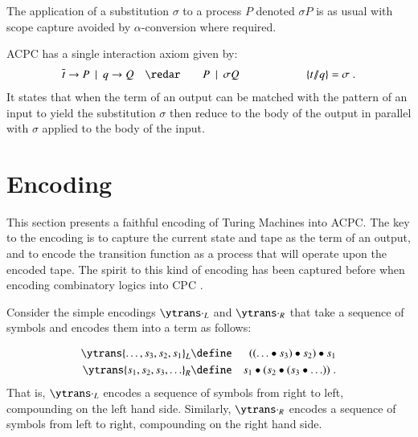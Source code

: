 \documentclass[submission,copyright,creativecommons]{eptcs}
\def\BNF{\ \  | \ \  }
\renewcommand{\iap}[1]{#1\to}
\renewcommand{\oap}[1]{\overline{#1}\to}
\begin{document}
The application of a substitution $\sigma$ to a process $P$ denoted $\sigma P$ is
as usual with scope capture avoided by $\alpha$-conversion where required.

ACPC has a single interaction axiom given by:
\begin{eqnarray*}
\oap t P \BNF \iap q Q &\quad\redar\quad& P \BNF \sigma Q\qquad\qquad\qquad \match t q = \sigma\;.
\end{eqnarray*}
It states that when the term of an output can be matched with the pattern of an input to
yield the substitution $\sigma$ then reduce to the body of the output in parallel with
$\sigma$ applied to the body of the input.



\section{Encoding}
\label{sec:enc}

\newcommand{\enclist}[2]{#2} 
This section presents a faithful encoding of Turing Machines into ACPC.
The key to the encoding is to capture the current state and tape as the term of
an output, and to encode the transition function as a process that will operate
upon the encoded tape.
The spirit to this kind of encoding has been captured before when encoding
combinatory logics into CPC \cite{GivenWilsonPhD}.

Consider the simple encodings $\ytrans \cdot _L$ and $\ytrans \cdot _R$ that take a sequence of symbols
and encodes them into a term as follows:
\enclist{
\begin{eqnarray*}
\ytrans{\ldots,s_3,s_2,s_1} _L &\define& s_1\bullet (s_2\bullet (s_3\bullet \ldots))\\
\ytrans{s_1,s_2,s_3,\ldots} _R &\define& s_1\bullet (s_2\bullet (s_3\bullet \ldots))\; .
\end{eqnarray*}
That is, $\ytrans \cdot _L$ encodes a sequence of symbols (to be from the left hand side of
the current head position) into a list starting with the symbol on the right (closest to the current
head position) at the head of the list.
Similarly, $\ytrans \cdot _R$ encodes a sequence of symbols (from the right hand side of
the current head position) into a list starting from the symbol on the left (again, closest to the current
head position).
}
{
\begin{eqnarray*}
\ytrans{\ldots,s_3,s_2,s_1} _L &\define& ((\ldots\bullet s_3)\bullet s_2)\bullet s_1\\
\ytrans{s_1,s_2,s_3,\ldots} _R &\define& s_1\bullet (s_2\bullet (s_3\bullet \ldots))\; .
\end{eqnarray*}
That is, $\ytrans \cdot _L$ encodes a sequence of symbols from right to left, compounding
on the left hand side.
Similarly, $\ytrans \cdot _R$ encodes a sequence of symbols from left to right,
compounding on the right hand side.
}
\end{document}
